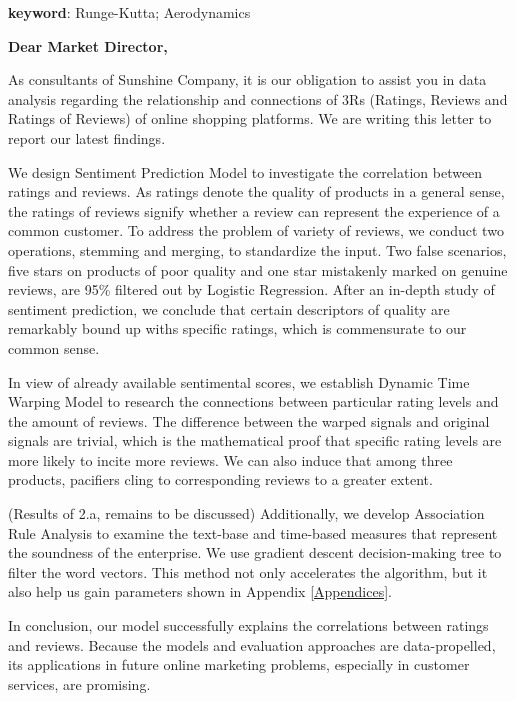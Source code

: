 \documentclass[12pt]{article}%
\begin{document}
\vspace{7pt}
\textbf{keyword}: Runge-Kutta; Aerodynamics



\newpage
\thispagestyle{empty}
{\large \textbf{Dear Market Director,}}

As consultants of Sunshine Company, it is our obligation to assist you in data analysis regarding the relationship and connections of 3Rs (Ratings, Reviews and Ratings of Reviews) of online shopping platforms. We are writing this letter to report our latest findings.

We design Sentiment Prediction Model to investigate the correlation between ratings and reviews. As ratings denote the quality of products in a general sense, the ratings of reviews signify whether a review can represent the experience of a common customer. To address the problem of variety of reviews, we conduct two operations, stemming and merging, to standardize the input. Two false scenarios, five stars on products of poor quality and one star mistakenly marked on genuine reviews, are 95\% filtered out by Logistic Regression. After an in-depth study of sentiment prediction, we conclude that certain descriptors of quality are remarkably bound up withs specific ratings, which is commensurate to our common sense.

In view of already available sentimental scores, we establish Dynamic Time Warping Model to research the connections between particular rating levels and the amount of reviews. The difference between the warped signals and original signals are trivial, which is the mathematical proof that specific rating levels are more likely to incite more reviews. We can also induce that among three products, pacifiers cling to corresponding reviews to a greater extent.

(Results of 2.a, remains to be discussed) Additionally, we develop Association Rule Analysis to examine the text-base and time-based measures that represent the soundness of the enterprise. We use gradient descent decision-making tree to filter the word vectors. This method not only accelerates the algorithm, but it also help us gain parameters shown in Appendix \ref{Appendices}.

In conclusion, our model successfully explains the correlations between ratings and reviews. Because the models and evaluation approaches are data-propelled, its applications in future online marketing problems, especially in customer services, are promising.
\end{document}
